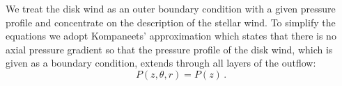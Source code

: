 We treat the disk wind as an outer boundary condition with a given pressure profile and concentrate on the description of the stellar wind. To simplify the equations we adopt Kompaneets' approximation \citep{1960SPhD....5...46K} which states that there is no axial pressure gradient so that the pressure profile of the disk wind, which is given as a boundary condition, extends through all layers of the outflow:
\begin{equation}
P(z,\theta, r) = P(z)\,.
\end{equation}

